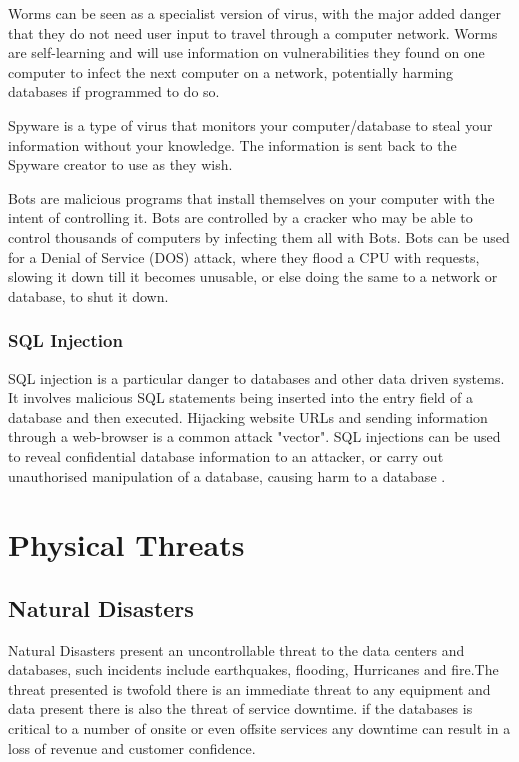 \documentclass[11pt, twocolumn]{article}
\begin{document}
Worms can be seen as a specialist version of virus, with the major added danger that they do not need user input to travel through a computer network. Worms are self-learning and will use information on vulnerabilities they found on one computer to infect the next computer on a network, potentially harming databases if programmed to do so\cite{Bas}.

Spyware is a type of virus that monitors your computer/database to steal your information without your knowledge.  The information is sent back to the Spyware creator to use as they wish\cite{Bas}.

Bots are malicious programs that install themselves on your computer with the intent of controlling it.  Bots are controlled by a cracker who may be able to control thousands of computers by infecting them all with Bots.  Bots can be used for a Denial of Service (DOS) attack, where they flood a CPU with requests, slowing it down till it becomes unusable, or else doing the same to a network or database, to shut it down\cite{Bas}. 

\subsubsection{SQL Injection}
SQL injection is a particular danger to databases and other data driven systems.  It involves malicious SQL statements being inserted into the entry field of a database and then executed.  Hijacking website URLs and sending information through a web-browser is a common attack "vector".  SQL injections can be used to reveal confidential database information to an attacker, or carry out unauthorised manipulation of a database, causing harm to a database \cite{Bas}.
\section{Physical Threats}


\subsection{Natural Disasters}

Natural Disasters present an uncontrollable threat to the data centers and databases, such incidents include earthquakes, flooding, Hurricanes and fire.The threat presented is twofold there is an immediate threat to any equipment and data present there is also the threat of service downtime. if the databases is critical to a number of onsite or even offsite services any downtime can result in a loss of revenue and customer confidence.
\end{document}
